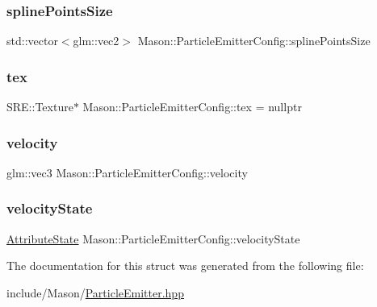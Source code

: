 \subsubsection{\texorpdfstring{spline\+Points\+Size}{splinePointsSize}}
{\footnotesize\ttfamily std\+::vector$<$glm\+::vec2$>$ Mason\+::\+Particle\+Emitter\+Config\+::spline\+Points\+Size}

\hypertarget{struct_mason_1_1_particle_emitter_config_a660e9a7613b158ac36bfc4ffe8b5f610}{}\label{struct_mason_1_1_particle_emitter_config_a660e9a7613b158ac36bfc4ffe8b5f610} 
\subsubsection{\texorpdfstring{tex}{tex}}
{\footnotesize\ttfamily S\+R\+E\+::\+Texture$\ast$ Mason\+::\+Particle\+Emitter\+Config\+::tex = nullptr}

\hypertarget{struct_mason_1_1_particle_emitter_config_af8c3efa305e0a0636576bebe60938c80}{}\label{struct_mason_1_1_particle_emitter_config_af8c3efa305e0a0636576bebe60938c80} 
\subsubsection{\texorpdfstring{velocity}{velocity}}
{\footnotesize\ttfamily glm\+::vec3 Mason\+::\+Particle\+Emitter\+Config\+::velocity}

\hypertarget{struct_mason_1_1_particle_emitter_config_a449a7ec64ad8d9f9be405f1beb5ee507}{}\label{struct_mason_1_1_particle_emitter_config_a449a7ec64ad8d9f9be405f1beb5ee507} 
\subsubsection{\texorpdfstring{velocity\+State}{velocityState}}
{\footnotesize\ttfamily \hyperlink{namespace_mason_aefc2ce7d9295b57af46ab6c8ebfc32f7}{Attribute\+State} Mason\+::\+Particle\+Emitter\+Config\+::velocity\+State}



The documentation for this struct was generated from the following file\+:\begin{DoxyCompactItemize}
\item 
include/\+Mason/\hyperlink{_particle_emitter_8hpp}{Particle\+Emitter.\+hpp}\end{DoxyCompactItemize}
